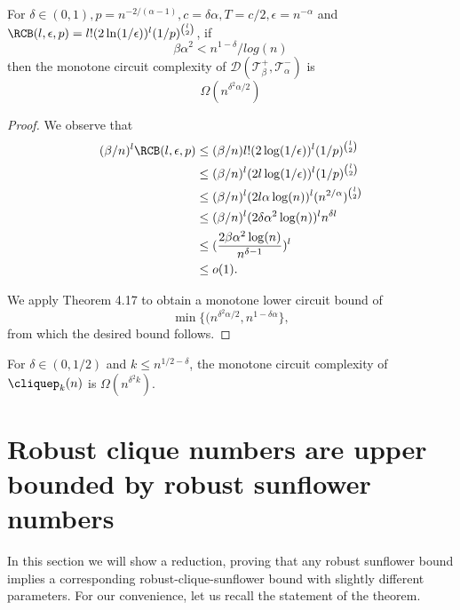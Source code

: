 \begin{corollary}
    For $\delta \in (0, 1), p = n^{-2/(\alpha - 1)}, c = \delta \alpha, T = c/ 2, \epsilon = n^{-\alpha}$ and $\RCB(l, \epsilon, p) = l!(2\ln(1/\epsilon))^l(1/p)^{\binom{l}{2}}$, if
    $$\beta \alpha^2 < n^{1-\delta}/log(n)$$
    then the monotone circuit complexity of $\mathcal{D}(\mathcal{T}^+_\beta, \mathcal{T}^-_\alpha)$ is 
    $$\Omega(n^{\delta^2 \alpha / 2})$$
\end{corollary}
\begin{proof}
    We observe that
    \begin{align*}
        (\beta / n)^l \RCB(l, \epsilon, p) &\leq (\beta / n) l!(2\log(1/\epsilon))^l (1/p)^{\binom{l}{2}} \\
        & \leq (\beta / n)^l (2l \log(1/\epsilon))^l (1/p)^{\binom{l}{2}} \\
        & \leq (\beta / n)^l (2l \alpha \log(n))^l(n^{2/\alpha})^{\binom{l}{2}} \\
        & \leq (\beta / n)^l (2\delta \alpha^2 
        \log(n))^l n^{\delta l} \\
        & \leq (\frac{2 \beta \alpha^2 \log(n)}{n^{\delta - 1 }})^l \\
        & \leq o(1).
    \end{align*}

    We apply Theorem 4.17 to obtain a monotone lower circuit bound of 
    $$\min\{ (n^{\delta^2 \alpha/2 }, n^{1 - \delta \alpha}\},$$
    from which the desired bound follows.
\end{proof}

\begin{corollary}
    For $\delta \in (0, 1/2)$ and $k \leq n^{1/2 - \delta}$, the monotone circuit complexity of $\cliquep_k(n)$ is $\Omega(n^{\delta^2 k})$.
\end{corollary}
\fi
\section{Robust clique numbers are upper bounded by robust sunflower numbers\label{sec:reduction}}
In this section we will show a reduction, proving that any robust sunflower bound implies a corresponding robust-clique-sunflower bound with slightly different parameters. For our convenience, let us recall the statement of the theorem.

